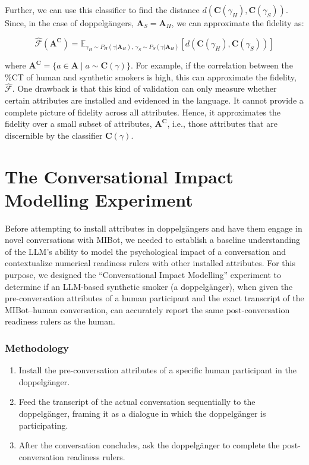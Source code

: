 Further, we can use this classifier to find the distance $d(\textbf{C}(\gamma_H), \textbf{C}(\gamma_S))$. Since, in the case of doppelgängers, $\textbf{A}_S = \textbf{A}_H$, we can approximate the fidelity as:

$$\hat{\mathcal{F}}(\textbf{A}^\textbf{C}) = \mathbb{E}_{\gamma_H \sim P_H (\gamma | \textbf{A}_H),  \:  \gamma_S \sim P_S(\gamma | \textbf{A}_H)}[d(
\textbf{C}(\gamma_H),\textbf{C}(\gamma_S)
)]$$


where $\textbf{A}^\textbf{C} = \{a \in \textbf{A} \mid a \sim \textbf{C}(\gamma)\}$. For example, if the correlation between the \%CT of human and synthetic smokers is high, this can approximate the fidelity, $\hat{\mathcal{F}}$. One drawback is that this kind of validation can only measure whether certain attributes are installed and evidenced in the language. It cannot provide a complete picture of fidelity across all attributes. Hence, it approximates the fidelity over a small subset of attributes, $\textbf{A}^\textbf{C}$, i.e., those attributes that are discernible by the classifier $\textbf{C}(\gamma)$.



\section{The Conversational Impact Modelling Experiment}
\label{sec:transcript-autoplay}

Before attempting to install attributes in doppelgängers and have them engage in novel conversations with MIBot, we needed to establish a baseline understanding of the LLM's ability to model the psychological impact of a conversation and contextualize numerical readiness rulers with other installed attributes. For this purpose, we designed the ``Conversational Impact Modelling'' experiment to determine if an LLM-based synthetic smoker (a doppelgänger), when given the pre-conversation attributes of a human participant and the exact transcript of the MIBot--human conversation, can accurately report the same post-conversation readiness rulers as the human.

\subsubsection{Methodology}
\begin{enumerate}
    \item Install the pre-conversation attributes of a specific human participant in the doppelgänger.
    \item Feed the transcript of the actual conversation sequentially to the doppelgänger, framing it as a dialogue in which the doppelgänger is participating.
    \item After the conversation concludes, ask the doppelgänger to complete the post-conversation readiness rulers.
\end{enumerate}

